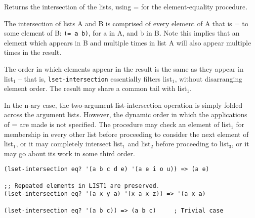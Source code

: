 \begin{entry}{%
  }

  Returns the intersection of the lists, using =
  for the element-equality procedure.

  The intersection of lists A and B is comprised of every element of A
  that is = to some element of B: \texttt{(=\ a\ b)}, for a in A, and
  b in B. Note this implies that an element which appears in B and
  multiple times in list A will also appear multiple times in the
  result.

  The order in which elements appear in the result is the same as they
  appear in list$_1$ -- that is, \texttt{lset-intersection}
  essentially filters list$_1$, without disarranging element
  order. The result may share a common tail with list$_1$.

  In the n-ary case, the two-argument list-intersection operation is
  simply folded across the argument lists. However, the dynamic order
  in which the applications of = are made is not specified. The
  procedure may check an element of list$_1$ for membership in every
  other list before proceeding to consider the next element of
  list$_1$, or it may completely intersect list$_1$ and list$_2$
  before proceeding to list$_3$, or it may go about its work in some
  third order.

\begin{verbatim}
(lset-intersection eq? '(a b c d e) '(a e i o u)) => (a e)

;; Repeated elements in LIST1 are preserved.
(lset-intersection eq? '(a x y a) '(x a x z)) => '(a x a)

(lset-intersection eq? '(a b c)) => (a b c)     ; Trivial case
\end{verbatim}
\end{entry}

